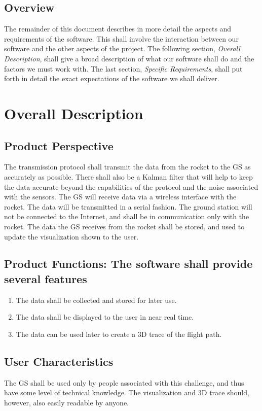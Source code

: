 \documentclass[onecolumn, draftclsnofoot,10pt, compsoc]{IEEEtran}
\begin{document}
\subsection{Overview}
The remainder of this document describes in more detail the aspects and
requirements of the software. This shall involve the interaction between our software and the
other aspects of the project. The following section, \textit{Overall Description}, shall give a broad
description of what our software shall do and the factors we must work with. The last section,
\textit{Specific Requirements}, shall put forth in detail the exact expectations of the software we shall
deliver.
\section{Overall Description}
\subsection{Product Perspective}
The transmission protocol shall transmit the data from the rocket to
the GS as accurately as possible. There shall also be a Kalman filter that will help to keep the
data accurate beyond the capabilities of the protocol and the noise associated with the
sensors. The GS will receive data via a wireless interface with the rocket. The data will be
transmitted in a serial fashion. The ground station will not be connected to the Internet, and
shall be in communication only with the rocket. The data the GS receives from the rocket shall
be stored, and used to update the visualization shown to the user.
\subsection{Product Functions: The software shall provide several features}
 \begin{enumerate}
    \item The data shall be collected and stored for later use.
    \item The data shall be displayed to the user in near real time.
    \item The data can be used later to create a 3D trace of the flight path.
 \end{enumerate}
\subsection{User Characteristics}
The GS shall be used only by people associated with this
challenge, and thus have some level of technical knowledge. The visualization and 3D trace
should, however, also easily readable by anyone.
\end{document}
